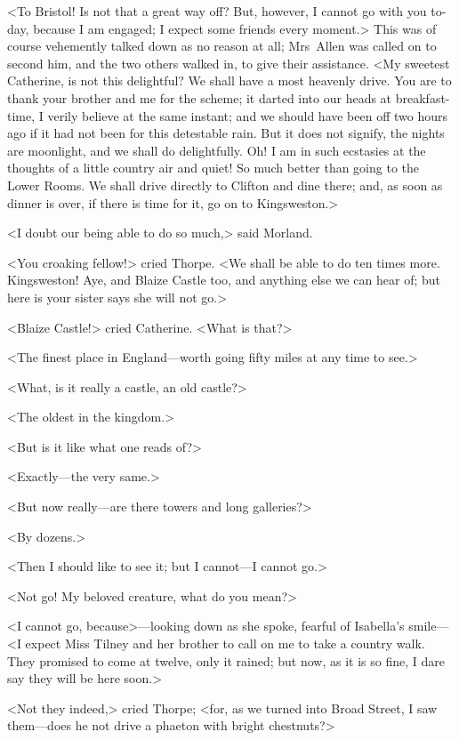  <To Bristol! Is not that a great way off? But, however, I cannot go with you to-day, because I am engaged; I expect some friends every moment.> This was of course vehemently talked down as no reason at all; Mrs~Allen was called on to second him, and the two others walked in, to give their assistance. <My sweetest Catherine, is not this delightful? We shall have a most heavenly drive. You are to thank your brother and me for the scheme; it darted into our heads at breakfast-time, I verily believe at the same instant; and we should have been off two hours ago if it had not been for this detestable rain. But it does not signify, the nights are moonlight, and we shall do delightfully. Oh! I am in such ecstasies at the thoughts of a little country air and quiet! So much better than going to the Lower Rooms. We shall drive directly to Clifton and dine there; and, as soon as dinner is over, if there is time for it, go on to Kingsweston.> 

 <I doubt our being able to do so much,> said Morland. 

 <You croaking fellow!> cried Thorpe. <We shall be able to do ten times more. Kingsweston! Aye, and Blaize Castle too, and anything else we can hear of; but here is your sister says she will not go.> 

 <Blaize Castle!> cried Catherine. <What is that?> 

 <The finest place in England—worth going fifty miles at any time to see.> 

 <What, is it really a castle, an old castle?> 

 <The oldest in the kingdom.> 

 <But is it like what one reads of?> 

 <Exactly—the very same.> 

 <But now really—are there towers and long galleries?> 

 <By dozens.> 

 <Then I should like to see it; but I cannot—I cannot go.> 

 <Not go! My beloved creature, what do you mean?> 

 <I cannot go, because>—looking down as she spoke, fearful of Isabella's smile—<I expect Miss Tilney and her brother to call on me to take a country walk. They promised to come at twelve, only it rained; but now, as it is so fine, I dare say they will be here soon.> 

 <Not they indeed,> cried Thorpe; <for, as we turned into Broad Street, I saw them—does he not drive a phaeton with bright chestnuts?> 

